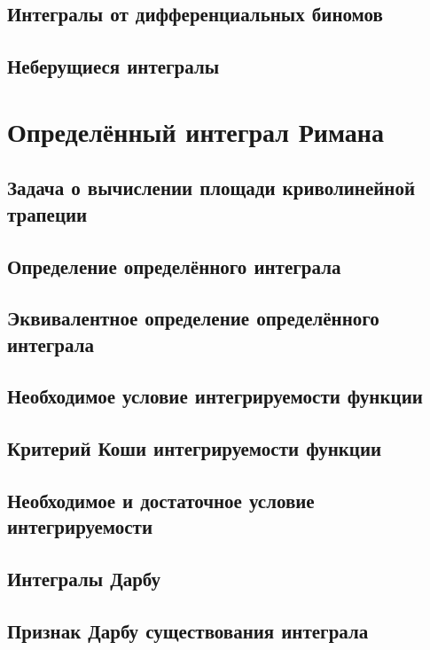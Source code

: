 \subsection{Интегралы от дифференциальных биномов}
 
\subsection{Неберущиеся интегралы}


\section{Определённый интеграл Римана}
\subsection{Задача о вычислении площади криволинейной трапеции}

\subsection{Определение определённого интеграла}

\subsection{Эквивалентное определение определённого интеграла}

\subsection{Необходимое условие интегрируемости функции}

\subsection{Критерий Коши интегрируемости функции}

\subsection{Необходимое и достаточное условие интегрируемости}

\subsection{Интегралы Дарбу}

\subsection{Признак Дарбу существования интеграла}

